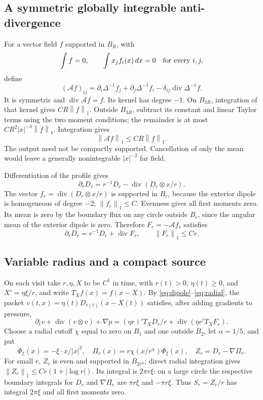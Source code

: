 \documentclass[11pt]{article}
\theoremstyle{remark}\newtheorem{remark}[theorem]{Remark}
\newcommand{\Div}{\operatorname{div}}
\newcommand{\norm}[2]{\left\|#1\right\|_{#2}}
\newcommand{\dd}{\,dx}
\begin{document}
\subsection{A symmetric globally integrable anti-divergence}
For a vector field $f$ supported in $B_R$, with
\[
 \int f=0,\qquad \int x_jf_i(x)\dd=0\quad\hbox{for every }i,j,
\]
define
\[
 (\mathcal Af)_{ij}=\partial_i\Delta^{-1}f_j+
 \partial_j\Delta^{-1}f_i-\delta_{ij}\Div\Delta^{-1}f.
\]
It is symmetric and $\Div\mathcal Af=f$. Its kernel has degree $-1$.
On $B_{3R}$, integration of that kernel gives $CR\norm f1$. Outside $B_{3R}$,
subtract its constant and linear Taylor terms using the two moment conditions;
the remainder is at most $CR^2|x|^{-3}\norm f1$. Integration gives
\begin{equation}\label{eq:anti}
 \norm{\mathcal Af}1\leq CR\norm f1.
\end{equation}
The output need not be compactly supported. Cancellation of only the mean
would leave a generally nonintegrable $|x|^{-2}$ far field.

Differentiation of the profile gives
\[
 \partial_rD_r=r^{-1}D_r-\Div(D_r\otimes x/r).
\]
The vector $f_r=\Div(D_r\otimes x/r)$ is supported in $B_r$, because the
exterior dipole is homogeneous of degree $-2$; $\norm{f_r}1\leq C$.
Evenness gives all first moments zero. Its mean is zero by the boundary flux
on any circle outside $B_r$, since the angular mean of the exterior dipole
is zero. Therefore $F_r=-\mathcal Af_r$ satisfies
\begin{equation}\label{eq:radial}
 \partial_rD_r=r^{-1}D_r+\Div F_r,
 \qquad \norm{F_r}1\leq Cr.
\end{equation}

\subsection{Variable radius and a compact source}
On each visit take $r,\eta,X$ to be $C^1$ in time, with $r(t)>0$, $\eta(t)\geq0$, and $X'=\eta\xi/r$, and write $T_X f(x)=f(x-X)$. By
\eqref{eq:dipole}--\eqref{eq:radial}, the packet
$v(t,x)=\eta(t)D_{r(t)}(x-X(t))$ satisfies, after adding gradients to pressure,
\begin{equation}\label{eq:packet}
 \partial_tv+\Div(v\otimes v)+\nabla p
 =(\eta r)'T_XD_r/r+\Div(\eta r'T_XF_r).
\end{equation}
Choose a radial cutoff $\chi$ equal to zero on $B_1$ and one outside $B_2$,
let $\alpha=1/5$, and put
\[
 \Phi_\xi(x)=-\xi\cdot x/|x|^2,\quad
 \Pi_r(x)=r\chi(x/r^\alpha)\Phi_\xi(x),\quad
 Z_r=D_r-\nabla\Pi_r.
\]
For small $r$, $Z_r$ is even and supported in $B_{2r^\alpha}$; direct radial
integration gives $\norm{Z_r}1\leq Cr(1+|\log r|)$. Its integral is
$2\pi r\xi$: on a large circle the respective boundary integrals for $D_r$
and $\nabla\Pi_r$ are $\pi r\xi$ and $-\pi r\xi$.
Thus $S_r=Z_r/r$ has integral $2\pi\xi$ and all first moments zero.
\end{document}
